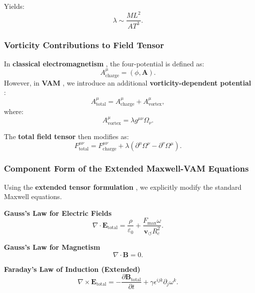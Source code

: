 \documentclass[a4paper,10pt]{article}
\begin{document}
Yields:
\begin{equation*}
    \lambda \sim \frac{M L^2}{A T^3}.
\end{equation*}

\subsubsection*{Vorticity Contributions to Field Tensor}
In \textbf{classical electromagnetism} , the four-potential is defined as:
\begin{equation*}
    A^\mu_\text{charge} = \left( \phi, \mathbf{A} \right).
\end{equation*}
However, in \textbf{VAM} , we introduce an additional \textbf{vorticity-dependent potential} :
\begin{equation*}
    A^\mu_\text{total} = A^\mu_\text{charge} + A^\mu_\text{vortex},
\end{equation*}
where:
\begin{equation*}
    A^\mu_\text{vortex} = \lambda g^{\mu\nu} \Omega_\nu.
\end{equation*}

The \textbf{total field tensor}  then modifies as:
\begin{equation*}
    F^{\mu\nu}_\text{total} = F^{\mu\nu}_\text{charge} + \lambda (\partial^\mu \Omega^\nu - \partial^\nu \Omega^\mu).
\end{equation*}

\subsubsection*{Component Form of the Extended Maxwell-VAM Equations}
Using the \textbf{extended tensor formulation} , we explicitly modify the standard Maxwell equations.

\textbf{Gauss's Law for Electric Fields}
\begin{equation*}
    \nabla \cdot \mathbf{E}_\text{total} = \frac{\rho}{\varepsilon_0} + \frac{F_{\max} \omega}{\mathbf{v}_{\scriptscriptstyle\boldsymbol{\circlearrowleft}} R_c^2}.
\end{equation*}

\textbf{Gauss's Law for Magnetism}
\begin{equation*}
    \nabla \cdot \mathbf{B} = 0.
\end{equation*}

\textbf{Faraday's Law of Induction (Extended)}
\begin{equation*}
    \nabla \times \mathbf{E}_\text{total} = - \frac{\partial \mathbf{B}_\text{total}}{\partial t} + \gamma \epsilon^{ijk} \partial_j \omega^k.
\end{equation*}
\end{document}
